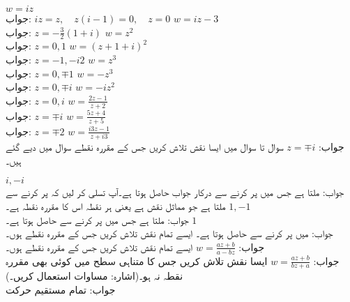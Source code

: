 \quad 
$w=iz$\\
جواب:\quad
$iz=z,\quad z(i-1)=0,\quad z=0$
\quad
$w=iz-3$\\
جواب:\quad
$z=-\tfrac{3}{2}(1+i)$
\quad
$w=z^2$\\
جواب:\quad
$z=0,1$
\quad
$w=(z+1+i)^2$\\
جواب:\quad
$z=-1,-i2$
\quad
$w=z^3$\\
جواب:\quad
$z=0,\mp 1$
\quad
$w=-z^3$\\
جواب:\quad
$z=0,\mp i$
\quad
$w=-iz^2$\\
جواب:\quad
$z=0, i$
\quad
$w=\tfrac{2z-1}{z+2}$\\
جواب:\quad
$z=\mp i$
\quad
$w=\tfrac{5z+4}{z+5}$\\
جواب:\quad
$z=\mp 2$
\quad
$w=\tfrac{i3z-1}{z+i3}$\\
جواب:\quad
$z=\mp i$
سوال  تا سوال  میں ایسا نقش تلاش کریں جس کے مقررہ نقطے سوال میں دیے گئے ہیں۔

\quad
$i,-i$\\
جواب:\quad  {} ملتا ہے جس میں  پر کرنے سے درکار جواب   حاصل ہوتا ہے۔آپ تسلی کر لیں کہ  پر کرنے سے  ملتا ہے جو مماثل نقش ہے یعنی ہر نقطہ اس کا مقررہ نقطہ ہے۔ 
\quad
$1, -1$\\
جواب:\quad  {} ملتا ہے جس میں  پر کرنے سے  حاصل ہوتا ہے۔
\quad
$1$\\
جواب:\quad  {}  میں  پر کرنے سے  حاصل ہوتا ہے۔
\quad
ایسے تمام نقش تلاش کریں جس کے مقررہ نقطے  ہوں۔\\
جواب:\quad
$w=\tfrac{az+b}{a-bz}$
\quad
ایسے تمام نقش تلاش کریں جس کے مقررہ نقطے  ہوں۔\\
جواب:\quad
$w=\tfrac{az+b}{bz+a}$
\quad
ایسا نقش تلاش کریں جس کا متناہی سطح میں کوئی بھی مقررہ نقطہ نہ ہو۔(اشارہ: مساوات  استعمال کریں۔)\\
جواب:\quad
تمام مستقیم حرکت


